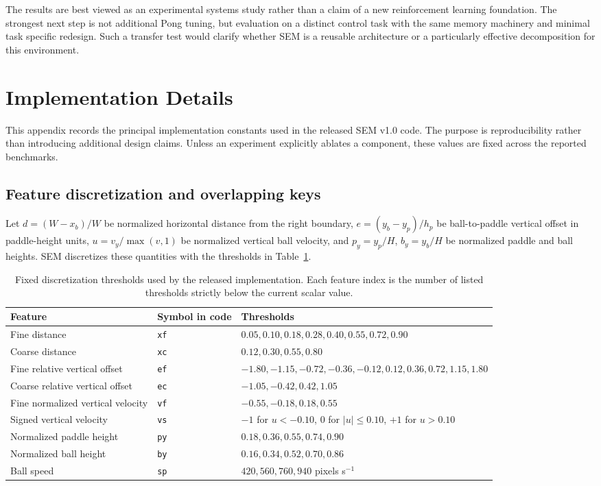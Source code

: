 \documentclass[10pt,twocolumn]{article}
\begin{document}
The results are best viewed as an experimental systems study rather than a claim of a new reinforcement learning foundation. The strongest next step is not additional Pong tuning, but evaluation on a distinct control task with the same memory machinery and minimal task specific redesign. Such a transfer test would clarify whether SEM is a reusable architecture or a particularly effective decomposition for this environment.


\appendix
\section{Implementation Details}
\label{app:implementation}
This appendix records the principal implementation constants used in the released SEM v1.0 code. The purpose is reproducibility rather than introducing additional design claims. Unless an experiment explicitly ablates a component, these values are fixed across the reported benchmarks.

\subsection{Feature discretization and overlapping keys}
Let $d=(W-x_b)/W$ be normalized horizontal distance from the right boundary, $e=(y_b-y_p)/h_p$ be ball-to-paddle vertical offset in paddle-height units, $u=v_y/\max(v,1)$ be normalized vertical ball velocity, and $p_y=y_p/H$, $b_y=y_b/H$ be normalized paddle and ball heights. SEM discretizes these quantities with the thresholds in Table~\ref{tab:implbins}.

\begin{table}[t]
\centering
\small
\caption{Fixed discretization thresholds used by the released implementation. Each feature index is the number of listed thresholds strictly below the current scalar value.}
\label{tab:implbins}
\begin{tabularx}{0.97\textwidth}{@{}l l X@{}}
\toprule
Feature & Symbol in code & Thresholds \\
\midrule
Fine distance & \texttt{xf} & $0.05, 0.10, 0.18, 0.28, 0.40, 0.55, 0.72, 0.90$ \\
Coarse distance & \texttt{xc} & $0.12, 0.30, 0.55, 0.80$ \\
Fine relative vertical offset & \texttt{ef} & $-1.80, -1.15, -0.72, -0.36, -0.12, 0.12, 0.36, 0.72, 1.15, 1.80$ \\
Coarse relative vertical offset & \texttt{ec} & $-1.05, -0.42, 0.42, 1.05$ \\
Fine normalized vertical velocity & \texttt{vf} & $-0.55, -0.18, 0.18, 0.55$ \\
Signed vertical velocity & \texttt{vs} & $-1$ for $u<-0.10$, $0$ for $|u|\leq0.10$, $+1$ for $u>0.10$ \\
Normalized paddle height & \texttt{py} & $0.18, 0.36, 0.55, 0.74, 0.90$ \\
Normalized ball height & \texttt{by} & $0.16, 0.34, 0.52, 0.70, 0.86$ \\
Ball speed & \texttt{sp} & $420, 560, 760, 940$ pixels s$^{-1}$ \\
\bottomrule
\end{tabularx}
\end{table}
\end{document}
